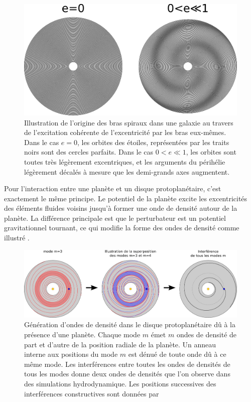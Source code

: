 \begin{figure}[htbp]
\centering
\includegraphics[width=0.9\linewidth]{figure/spiral_arms.pdf}
\caption[Origine des bras spiraux dans une galaxie.]{Illustration de l'origine des bras spiraux dans une galaxie au travers de
l'excitation cohérente de l'excentricité par les bras eux-mêmes. Dans le cas \og $e=0$\fg, les orbites des étoiles, représentées
par les traits noirs sont des cercles parfaits. Dans le cas \og $0<e\ll 1$\fg, les orbites sont toutes très légèrement
excentriques, et les arguments du périhélie légèrement décalés à mesure que les demi-grands axes
augmentent.}\label{fig:spiral_arms}
\end{figure}

\bigskip

Pour l'interaction entre une planète et un disque protoplanétaire, c'est exactement le même principe. Le potentiel de la planète excite les excentricités des éléments fluides voisins jusqu'à former une onde de densité autour de la planète. La différence principale est que le perturbateur est un potentiel gravitationnel tournant, ce qui modifie la forme des ondes de densité comme illustré . 

\begin{figure}[htbp]
\centering
\includegraphics[width=\linewidth]{figure/lindblad_torque.pdf}
\caption[Construction de l'onde de densité due à la présence d'une planète.]{Génération d'ondes de densité dans le disque
protoplanétaire dû à la présence d'une planète. Chaque mode $m$ émet $m$ ondes de densité de part et d'autre de la position
radiale de la planète. Un anneau interne aux positions du mode $m$ est dénué de toute onde dû à ce même mode. Les interférences
entre toutes les ondes de densités de tous les modes donne deux ondes de densités que l'on observe dans des simulations
hydrodynamique. Les positions successives des interférences constructives sont données par \cite[eq. (13) et
(24)]{ogilvie2002wake}}\label{fig:lindblad_torque}
\end{figure}


